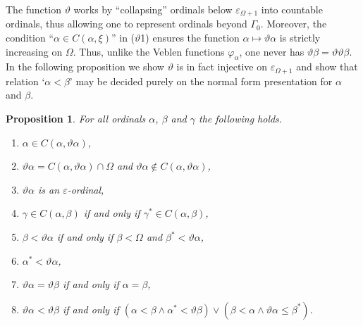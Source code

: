 \documentclass[UKenglish,cleveref,DIV=12]{scrartcl}
\newtheorem{proposition}[lemma]{Proposition}
\theoremstyle{definition}
\theoremstyle{definition}
\begin{document}
The function $\vartheta$ works by ``collapsing'' ordinals below $\varepsilon_{\Omega+1}$ into countable ordinals, thus allowing one to represent ordinals beyond $\Gamma_0$. Moreover, the condition ``$\alpha\in C(\alpha,\xi)$''
in ($\vartheta$1) ensures the function $\alpha\mapsto\vartheta\alpha$ is
strictly increasing on $\Omega$. Thus, unlike the Veblen functions
$\varphi_\alpha$, one never has $\vartheta\beta=\vartheta\vartheta\beta$. In the following proposition we show $\vartheta$ is in fact injective on $\varepsilon_{\Omega+1}$ and show that relation `$\alpha<\beta$' may be decided purely on the normal form presentation for $\alpha$ and $\beta$.
\begin{proposition}\label{extprop:thetaitems1} For all ordinals $\alpha$, $\beta$ and $\gamma$ the following holds.
\begin{enumerate}
  \item $\alpha\in C(\alpha,\vartheta\alpha)$,
  \item $\vartheta\alpha=C(\alpha,\vartheta\alpha)\cap\Omega$ and $\vartheta\alpha\not\in C(\alpha,\vartheta\alpha)$,
  \item $\vartheta\alpha$ is an $\varepsilon$-ordinal,
  \item $\gamma\in C(\alpha,\beta)$ if and only if $\gamma^*\in C(\alpha,\beta)$,
  \item $\beta<\vartheta\alpha$ if and only if $\beta<\Omega$ and $\beta^*<\vartheta\alpha$,
  \item $\alpha^*<\vartheta\alpha$,
  \item $\vartheta\alpha=\vartheta\beta$ if and only if $\alpha=\beta$,
  \item $\vartheta\alpha<\vartheta\beta$ if and only if $(\alpha<\beta\land\alpha^*<\vartheta\beta)\lor (\beta<\alpha\land\vartheta\alpha\le\beta^*)$.
\end{enumerate}
\end{proposition}
\end{document}
